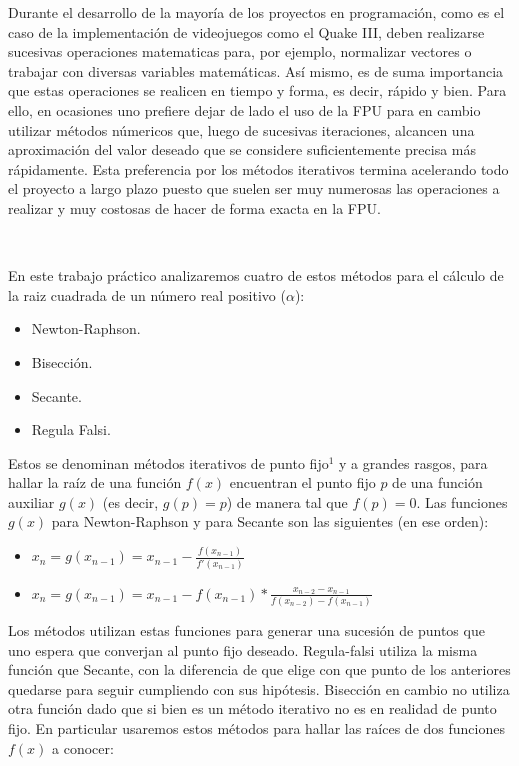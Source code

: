 Durante el desarrollo de la mayoría de los proyectos en programación, como es el caso de la implementación de videojuegos como el Quake III, deben realizarse sucesivas operaciones matematicas para, por ejemplo, normalizar vectores o trabajar con diversas variables matemáticas. Así mismo, es de 
suma importancia que estas operaciones se realicen en tiempo y forma, es decir, rápido y bien. Para ello, en ocasiones uno prefiere dejar de lado el uso de la FPU para en cambio utilizar métodos númericos que, luego de sucesivas iteraciones, alcancen una aproximación del valor deseado que se considere suficientemente precisa más rápidamente. Esta preferencia por los métodos iterativos termina acelerando todo el proyecto a largo plazo puesto que suelen ser muy numerosas las operaciones a realizar y muy costosas de hacer de forma exacta en la FPU.

~

En este trabajo práctico analizaremos cuatro de estos métodos para el cálculo de la raiz cuadrada de un número real positivo ($\alpha$): 
\begin{itemize}
	\item Newton-Raphson.
	\item Bisección.
	\item Secante.
	\item Regula Falsi.
\end{itemize}

Estos se denominan métodos iterativos de punto fijo$^1$ y a grandes rasgos, para hallar la raíz de una función $f(x)$ encuentran el punto fijo $p$ de una función auxiliar $g(x)$ (es decir, $g(p) = p$) de manera tal que $f(p) = 0$. Las funciones $g(x)$ para Newton-Raphson y para Secante son las siguientes (en ese orden):
\begin{itemize}
	\item $\displaystyle x_n = g(x_{n-1}) = x_{n-1} - \frac{f(x_{n-1})}{f'(x_{n-1})}$
	\item $\displaystyle x_n = g(x_{n-1}) = x_{n-1} - f(x_{n-1})*\frac{x_{n-2} - x_{n-1}}{f(x_{n-2}) - f(x_{n-1})}$
\end{itemize}

Los métodos utilizan estas funciones para generar una sucesión de puntos que uno espera que converjan al punto fijo deseado. Regula-falsi utiliza la misma función que Secante, con la diferencia de que elige con que punto de los anteriores quedarse para seguir cumpliendo con sus hipótesis. Bisección en cambio no utiliza otra función dado que si bien es un método iterativo no es en realidad de punto fijo.
En particular usaremos estos métodos para hallar las raíces de dos funciones $f(x)$ a conocer:

